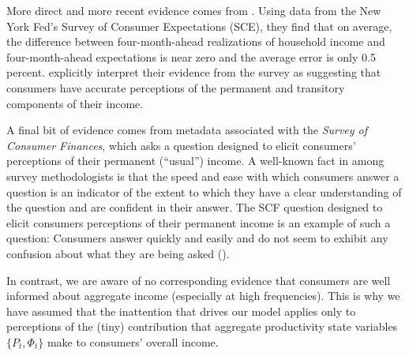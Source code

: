 \documentclass[titlepage]{article}
\begin{document}
More direct and more recent evidence comes from \cite{kmpIncomeExpectations}.  Using data from the New York Fed's Survey of Consumer Expectations (SCE), they find that on average, the difference between four-month-ahead realizations of household income and four-month-ahead expectations is near zero and the average error is only 0.5 percent. \cite{kmpIncomeExpectations} explicitly interpret their evidence from the survey as suggesting that consumers have accurate perceptions of the permanent and transitory components of their income.

A final bit of evidence comes from metadata associated with the \textit{Survey of Consumer Finances}, which asks a question designed to elicit consumers' perceptions of their permanent (``usual'') income.  A well-known fact in among survey methodologists is that the speed and ease with which consumers answer a question is an indicator of the extent to which they have a clear understanding of the question and are confident in their answer.  The SCF question designed to elicit consumers perceptions of their permanent income is an example of such a question: Consumers answer quickly and easily and do not seem to exhibit any confusion about what they are being asked (\cite{kennickellPermanent}).

In contrast, we are aware of no corresponding evidence that consumers are well informed about aggregate income (especially at high frequencies). %
 This is why we have assumed that the inattention that drives our model applies only to perceptions of the (tiny) contribution that aggregate productivity state variables $\{P_t,\Phi_t\}$ make to consumers' overall income.
\end{document}
